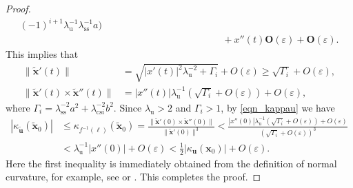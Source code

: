 \documentclass{amsart}
\theoremstyle{definition}
\numberwithin{equation}{section}
\numberwithin{figure}{section}
\begin{document}
\begin{proof}
\begin{align*}
(-1)^{i+1}\lambda_{\mathrm{u}}^{-1}\lambda_{\mathrm{ss}}^{-1}a\bigr)\\
&\hspace{140pt}+x''(t)\boldsymbol{O}(\varepsilon)+\boldsymbol{O}(\varepsilon).
\end{align*}
This implies that 
\begin{align*}
\|\widetilde{\boldsymbol{x}}'(t)\|&=\sqrt{|x'(t)|^2\lambda_{\mathrm{u}}^{-2}+\varGamma_i}+O(\varepsilon)\geq \sqrt{\varGamma_i}+O(\varepsilon),\\
\|\widetilde{\boldsymbol{x}}'(t)\times \widetilde{\boldsymbol{x}}''(t)\|&=|x''(t)|\lambda_{\mathrm{u}}^{-1}(\sqrt{\varGamma_i}+O(\varepsilon))+O(\varepsilon),
\end{align*}
where $\varGamma_i=\lambda_{\mathrm{ss}}^{-2}a^2+\lambda_{\mathrm{cs} i}^{-2}b^2$.
Since $\lambda_{\mathrm{u}}>2$ and $\varGamma_i>1$, by \eqref{eqn_kappau} we have 
\begin{align*}
|\kappa_{\widetilde{\boldsymbol{u}}}(\widetilde{\boldsymbol{x}}_0)|&\leq \kappa_{f^{-1}(\ell)}(\widetilde{\boldsymbol{x}}_0)=\frac{\|\widetilde{\boldsymbol{x}}'(0)\times \widetilde{\boldsymbol{x}}''(0)\|}{\|\widetilde{\boldsymbol{x}}'(0)\|^3}
<\frac{|x''(0)|\lambda_{\mathrm{u}}^{-1}(\sqrt{\varGamma_i}+O(\varepsilon))+O(\varepsilon)}{(\sqrt{\varGamma_i}+O(\varepsilon))^3}\\
&<\lambda_{\mathrm{u}}^{-1}|x''(0)|+O(\varepsilon)<\frac12 |\kappa_{\boldsymbol{u}}(\boldsymbol{x}_0)|+O(\varepsilon).
\end{align*}
Here the first inequality is immediately obtained from the definition of normal curvature, for example, see 
\cite[Chapter 3, Definition 3]{dC76} or \cite[Section 2.2]{Ko21}.
This completes the proof.
\end{proof}
\end{document}
